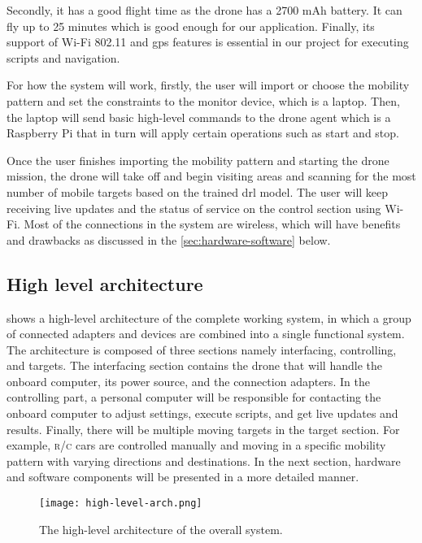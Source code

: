 \documentclass[../main.tex]{subfiles}
\begin{document}
Secondly, it has a good flight time 
as the \anafi drone has a 2700 mAh battery. 
It can fly up to 25 minutes which is good enough 
for our application.
Finally, its support of Wi-Fi 802.11 and \gls{gps} 
features is essential in our project for 
executing scripts and navigation. 

For how the system will work, firstly, the user 
will import or choose the mobility pattern and set
the constraints to the monitor device,
which is a laptop. Then, the laptop will send basic
high-level commands to the drone agent which is a
Raspberry Pi that in turn will apply certain
operations such as start and stop.

Once the user finishes importing the mobility pattern
and starting the drone mission, the drone will
take off and begin visiting areas and scanning for
the most number of mobile targets based on the
trained \gls{drl} model.
The user will keep receiving live updates and the
status of service on the control section using Wi-Fi.
Most of the connections in the system are wireless,
which will have benefits and drawbacks as discussed
in the \cref{sec:hardware-software} below.

\subsection{High level architecture}

 shows a high-level architecture 
of the complete working system, in which a group 
of connected adapters and devices are combined into 
a single functional system. 
The architecture is composed of three sections namely
interfacing, controlling, and targets. 
The interfacing section contains the drone that 
will handle the onboard computer, its power source, 
and the connection adapters. 
In the controlling part, a personal computer 
will be responsible for contacting the onboard computer 
to adjust settings, execute scripts, and get 
live updates and results. 
Finally, there will be multiple moving targets 
in the target section. For example, 
\textsc{r/c} cars are controlled manually and moving in 
a specific mobility pattern with varying directions 
and destinations. 
In the next section, hardware and software components 
will be presented in a more detailed manner.

\begin{figure}[bt]
    \centering
    \texttt{[image: high-level-arch.png]}
    \caption{The high-level architecture of the overall system.}
    \label{fig:arch-fig}
\end{figure}
\end{document}
